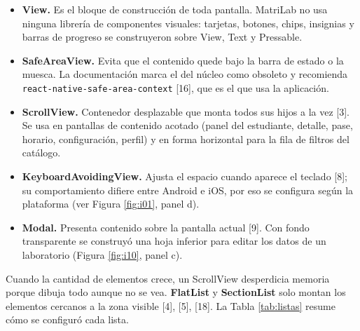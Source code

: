 \begin{itemize}[label=\textcolor{unsared}{\textbullet}, leftmargin=*]
    \item \textbf{View.} Es el bloque de construcción de toda pantalla. MatriLab no usa ninguna librería de componentes visuales: tarjetas, botones, chips, insignias y barras de progreso se construyeron sobre View, Text y Pressable.
    \item \textbf{SafeAreaView.} Evita que el contenido quede bajo la barra de estado o la muesca. La documentación marca el del núcleo como obsoleto y recomienda \texttt{react-native-safe-area-context} [16], que es el que usa la aplicación.
    \item \textbf{ScrollView.} Contenedor desplazable que monta todos sus hijos a la vez [3]. Se usa en pantallas de contenido acotado (panel del estudiante, detalle, pase, horario, configuración, perfil) y en forma horizontal para la fila de filtros del catálogo.
    \item \textbf{KeyboardAvoidingView.} Ajusta el espacio cuando aparece el teclado [8]; su comportamiento difiere entre Android e iOS, por eso se configura según la plataforma (ver Figura \ref{fig:i01}, panel d).
    \item \textbf{Modal.} Presenta contenido sobre la pantalla actual [9]. Con fondo transparente se construyó una hoja inferior para editar los datos de un laboratorio (Figura \ref{fig:i10}, panel c).
\end{itemize}

\vspace{0.2cm}

Cuando la cantidad de elementos crece, un ScrollView desperdicia memoria porque dibuja todo aunque no se vea. \textbf{FlatList} y \textbf{SectionList} solo montan los elementos cercanos a la zona visible [4], [5], [18]. La Tabla \ref{tab:listas} resume cómo se configuró cada lista.

